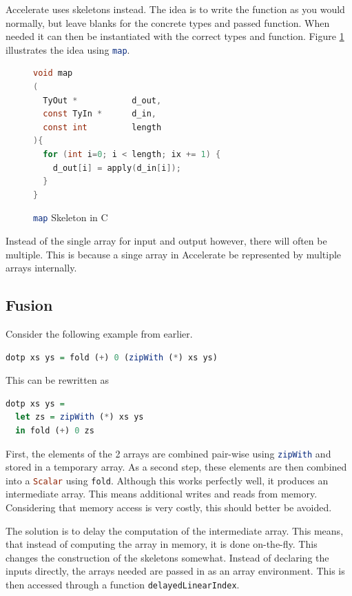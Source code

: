 \documentclass[a4paper,bibliography=totocnumbered,parskip,headsepline]{scrbook}
\begin{document}
Accelerate uses skeletons instead.
The idea is to write the function as you would normally, but leave blanks for the concrete types and passed function.
When needed it can then be instantiated with the correct types and function.
Figure \ref{fig:mapskelC} illustrates the idea using \lstinline[language=haskell]!map!.

\begin{figure}[htb]
\begin{lstlisting}[language=C]
void map
(
  TyOut *           d_out,
  const TyIn *      d_in,
  const int         length
){
  for (int i=0; i < length; ix += 1) {
    d_out[i] = apply(d_in[i]);
  }
}
\end{lstlisting}
\caption{\lstinline[language=haskell]!map! Skeleton in C}
\label{fig:mapskelC}
\end{figure}

Instead of the single array for input and output however, there will often be multiple.
This is because a singe array in Accelerate be represented by multiple arrays internally.

\subsection{Fusion}
Consider the following example from earlier.
\begin{lstlisting}[language=haskell]
dotp xs ys = fold (+) 0 (zipWith (*) xs ys)
\end{lstlisting}

This can be rewritten as

\begin{lstlisting}[language=haskell]
dotp xs ys =
  let zs = zipWith (*) xs ys
  in fold (+) 0 zs
\end{lstlisting}

First, the elements of the 2 arrays are combined pair-wise using \lstinline[language=haskell]!zipWith! and stored in a temporary array.
As a second step, these elements are then combined into a \lstinline[language=haskell]!Scalar! using \lstinline[language=haskell]!fold!.
Although this works perfectly well, it produces an intermediate array.
This means additional writes and reads from memory.
Considering that memory access is very costly, this should better be avoided.

The solution is to delay the computation of the intermediate array.
This means, that instead of computing the array in memory, it is done on-the-fly.
This changes the construction of the skeletons somewhat.
Instead of declaring the inputs directly, the arrays needed are passed in as an array environment.
This is then accessed through a function \lstinline[language=haskell]!delayedLinearIndex!.
\end{document}
